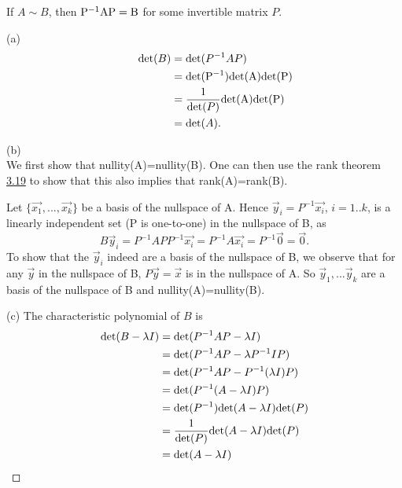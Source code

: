\documentclass[
  a4paper,
  DIV=11,
  numbers=noendperiod,
  oneside]{scrreprt}
\theoremstyle{definition}
\theoremstyle{remark}
\newenvironment{fbx}[3]{\begin{tcolorbox}[enhanced, breakable,%
attach boxed title to top*={xshift=1.4pt},
boxed title style={boxrule=0.0mm, fuzzy shadow={1pt}{-1pt}{0mm}{0.1mm}{gray}, arc=.3em, rounded corners=east, sharp corners=west}, colframe=#1-color2, colbacktitle=#1-color1, colback = white, coltitle=black,  titlerule=0mm, toprule=0pt, bottomrule=.7pt, leftrule=.3em, rightrule=0pt, outer arc=.3em,  arc=0pt,	 sharp corners = east, left=.5em, bottomtitle=1mm, toptitle=1mm,title=\textbf{#2}\hspace{0.5em}{#3}]}
{\end{tcolorbox}}
\begin{document}
\label{Proofux2a-5.6}
\begin{fbx}{Proof}{Proof}{}
\label{Proof*-5.6}
If \(A \sim B\), then \({\rm P^{-1}AP = B}\) for some invertible matrix
\(P\).

(a)\\
\[\begin{alignedat}{2}
            \qquad {\rm det}(B) &= {\rm det}(P^{-1}AP) \\
            {} &= {\rm det(P^{-1}){\rm det}(A){\rm det}(P)} \\
            {} &= \frac{1}{{\rm det}(P)}{\rm det(A){\rm det}(P)} \\
            {} &= {\rm det}(A). \\
        \end{alignedat}\]

(b)\\
We first show that nullity(A)=nullity(B). One can then use the rank
theorem \hyperref[ranktheorem]{3.19} to show that this also implies that
rank(A)=rank(B).

Let \(\{\vec{x_1},..., \vec{x_k}\}\) be a basis of the nullspace of A.
Hence \(\vec{y}_i= P^{-1}\vec{x_i}\), \(i=1..k\), is a linearly
independent set (P is one-to-one) in the nullspace of B, as
\[ B \vec{y}_i = P^{-1}A P P^{-1}\vec{x_i} = P^{-1}A \vec{x_i} = P^{-1}\vec{0} = \vec{0}. \]
To show that the \(\vec{y}_i\) indeed are a basis of the nullspace of B,
we observe that for any \(\vec{y}\) in the nullspace of B,
\(P\vec{y} = \vec{x}\) is in the nullspace of A. So
\(\vec{y}_1, ... \vec{y}_k\) are a basis of the nullspace of B and
nullity(A)=nullity(B).

(c) The characteristic polynomial of \(B\) is \[\begin{alignedat}{2}
            {\rm det}(B - \lambda I) &= {\rm det}(P^{-1}AP - \lambda I) \\
            {} &= {\rm det}(P^{-1}AP - \lambda P^{-1}IP) \\
            {} &= {\rm det}(P^{-1}AP - P^{-1}(\lambda I)P) \\
            {} &= {\rm det}(P^{-1}(A - \lambda I)P) \\
            {} &= {\rm det}(P^{-1}){\rm det}(A - \lambda I){\rm det}(P) \\
            {} &= \frac{1}{{\rm det}(P)}{\rm det}(A - \lambda I){\rm det}(P) \\
            {} &= {\rm det}(A - \lambda I)  
        \end{alignedat}\] ~◻

\end{fbx}
\end{document}

